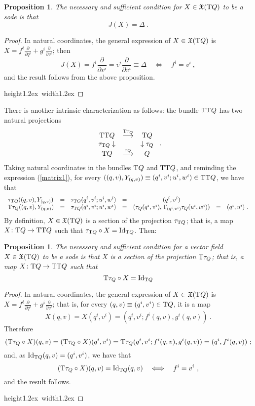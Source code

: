 \documentclass[12pt]{report}
\newtheorem{prop}[teor]{Proposition}
\def\dst{\displaystyle}
\def\derpar#1#2{\frac{\partial{#1}}{\partial{#2}}}
\def\mapping#1{\mathrel{\mathop{\longrightarrow}\limits^{#1}}}
\def\qed{\ifvmode\removelastskip\fi
{\unskip\nobreak\hfil\penalty50\hbox{}\nobreak\hfil
\hbox{\vrule height1.2ex width1.2ex}\parfillskip=0pt
\finalhyphendemerits=0 \par\smallskip}}
\def\vf{\mathfrak X}
\def\Tan{{\rm T}}
\begin{document}
\begin{prop}
The necessary and sufficient condition for $X\in\vf(\Tan Q)$ to be a {\sc sode} is that 
$$
J(X)=\Delta \ .
$$
\end{prop}
\begin{proof}
In natural coordinates, the general expression of $X\in\vf(\Tan Q)$ is
\(\dst X=f^i\derpar{}{q^i}+g^i\derpar{}{v^i}\); then
$$
J(X)=f^i\derpar{}{v^i}=v^i\derpar{}{v^i}\equiv\Delta
\quad \Longleftrightarrow \quad f^i=v^i \ ,
$$
and the result follows from the above proposition.
\\ \qed  \end{proof}

There is another intrinsic characterization as follows:
the bundle $\Tan \Tan Q$ has two natural projections
$$
\begin{array}{ccc}
\Tan\Tan Q&\mapping{\Tan\tau_Q}&\Tan Q
\\
\tau_{\Tan Q}\downarrow& &\downarrow\tau_Q
\\
\Tan Q&\mapping{\tau_Q}&Q 
\end{array} \ .
$$
Taking natural coordinates in the bundles $\Tan Q$ and
$\Tan\Tan Q$, and reminding the expression (\ref{matrix1}),
for every $((q,v),Y_{(q,v)})\equiv (q^i,v^i;u^i,w^i)\in\Tan\Tan Q$,
we have that
$$
\begin{array}{ccccccc}
\tau_{\Tan Q}((q,v),Y_{(q,v)})&=&\tau_{\Tan Q}(q^i,v^i;u^i,w^i)&=&(q^i,v^i)& & \\
\Tan\tau_Q((q,v),Y_{(q,v)})&=&\tau_{\Tan Q}(q^i,v^i;u^i,w^i)&=&
(\tau_Q(q^i,v^i),\Tan_{(q^i,v^i)}\tau_Q(u^i,w^i))&=&(q^i,u^i) \ .
\end{array}
$$
By definition, $X\in\vf(\Tan Q)$ is a section of the projection
$\tau_{\Tan Q}$; that is, a map $X\colon\Tan Q\to\Tan\Tan Q$ 
such that $\tau_{\Tan Q}\circ X={\rm Id}_{\Tan Q}$. Then:

\begin{prop}
The necessary and sufficient condition for a vector field
$X\in\vf(\Tan Q)$ to be a {\sc sode} is that $X$ is a section
of the projection $\Tan\tau_Q$; that is,  a map
$X\colon\Tan Q\to\Tan\Tan Q$ such that
$$
\Tan\tau_Q\circ X ={\rm Id}_{\Tan Q}
$$
\end{prop}
\begin{proof}
In natural coordinates, the general expression of
$X\in\vf(\Tan Q)$ is
\(\dst X=f^i\derpar{}{q^i}+g^i\derpar{}{v^i}\);
that is, for every
$(q,v)\equiv (q^i,v^i)\in\Tan Q$, it is a map
$$
X(q,v)=X(q^i,v^i)=(q^i,v^i;f^i(q,v),g^i(q,v)) \ .
$$
Therefore
$$
(\Tan\tau_Q\circ X)(q,v)=(\Tan\tau_Q\circ X)(q^i,v^i)=
\Tan\tau_Q(q^i,v^i;f^i(q,v),g^i(q,v))=(q^i,f^i(q,v)) \ ;
$$
and, as ${\rm Id}_{\Tan Q}(q,v)=(q^i,v^i)$, we have that
$$
(\Tan\tau_Q\circ X)(q,v)={\rm Id}_{\Tan Q}(q,v)\quad
\Longleftrightarrow \quad f^i=v^i \ ,
$$
and the result follows.
\\ \qed  \end{proof}
\end{document}
